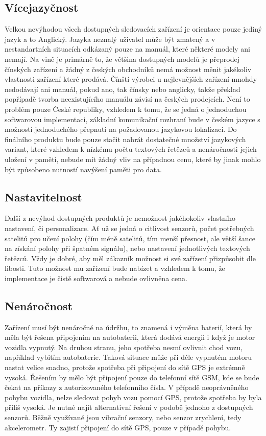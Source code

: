 \documentclass[FM,BP]{tulthesis}
\begin{document}
\subsection{Vícejazyčnost}
Velkou nevýhodou všech dostupných sledovacích zařízení je orientace pouze jediný jazyk a to Anglický. Jazyka neznalý uživatel může být zmatený a v nestandartních situacích odkázaný pouze na manuál, které některé modely ani nemají. Na vině je primárně to, že většina dostupných modelů je přeprodej čínských zařízení a žádný z českých obchodníků nemá možnost měnit jakékoliv vlastnosti zařízení které prodává. Čínští výrobci u nejlevnějších zařízení mnohdy nedodávají ani manuál, pokud ano, tak čínsky nebo anglicky, takže překlad popřípadě tvorba neexistujícího manuálu závisí na českých prodejcích. Není to problém pouze České republiky, vzhledem k tomu, že se jedná o jednoduchou softwarovou implementaci, základní komunikační rozhraní bude v českém jazyce s možností jednoduchého přepnutí na požadovanou jazykovou lokalizaci. Do finálního produktu bude pouze stačit nahrát dostatečné množství jazykových variant, které vzhledem k nízkému počtu textových řetězců a nenáročnosti jejich uložení v paměti, nebude mít žádný vliv na případnou cenu, které by jinak mohlo být způsobeno nutností navýšení paměti pro data.

\subsection{Nastavitelnost}
Další z nevýhod dostupných produktů je nemožnost jakéhokoliv vlastního nastavení, či personalizace. Ať už se jedná o citlivost senzorů, počet potřebných satelitů pro učení polohy (čím méně satelitů, tím menší přesnost, ale větší šance na získání polohy při špatném signálu), nebo nastavení jednotlivých textových řetězců. Vždy je dobré, aby měl zákazník možnost si své zařízení přizpůsobit dle libosti. Tuto možnost mu zařízení bude nabízet a vzhledem k tomu, že implementace je čistě softwarová a nebude ovlivněna cena.

\subsection{Nenáročnost}
Zařízení musí být nenáročné na údržbu, to znamená i výměna baterií, která by měla být řešena připojením na autobaterii, která dodává energii i když je motor vozidla vypnutý. Na druhou stranu, jeho spotřeba nesmí ovlivnit chod vozu, například vybitím autobaterie. Taková situace může při déle vypnutém motoru nastat velice snadno, protože spotřeba při připojení do sítě GPS je extrémně vysoká. Řešením by mělo být připojení pouze do telefonní sítě GSM, kde se bude čekat na příkazy z autorizovaného telefonního čísla. V případě neoprávněného pohybu vozidla, nelze sledovat pohyb vozu pomocí GPS, protože spotřeba by byla příliš vysoká. Je nutné najít alternativní řešení v podobě jednoho z dostupných senzorů. Běžně využívané jsou vibrační senzory, nebo senzor zrychlení, tedy akcelerometr. Ty zajistí připojení do sítě GPS, pouze v případě pohybu.
\end{document}
